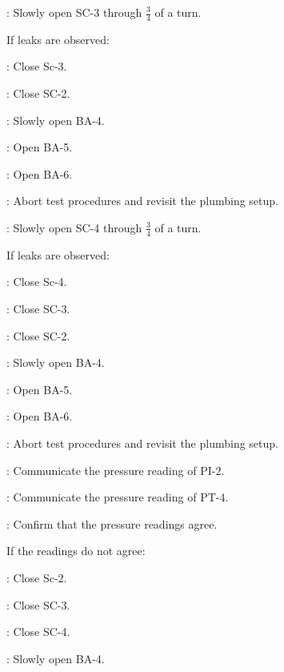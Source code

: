\begin{checklist}
\begin{checklist}
    \end{checklist}
    \item \primary{}: Slowly open SC-3 through $\frac{3}{4}$ of a turn.
    \item If leaks are observed:
    \begin{checklist}
            \item \primary{}: Close Sc-3.
            \item \primary{}: Close SC-2.
            \item \primary{}: Slowly open BA-4.
            \item \primary{}: Open BA-5. 
            \item \primary{}: Open BA-6. 
            \item \ops{}: Abort test procedures and revisit the plumbing setup. 
    \end{checklist}
    \item \primary{}: Slowly open SC-4 through $\frac{3}{4}$ of a turn.
    \item If leaks are observed:
    \begin{checklist}
            \item \primary{}: Close Sc-4.
            \item \primary{}: Close SC-3.
            \item \primary{}: Close SC-2. 
            \item \primary{}: Slowly open BA-4.
            \item \primary{}: Open BA-5. 
            \item \primary{}: Open BA-6. 
            \item \ops{}: Abort test procedures and revisit the plumbing setup. 
    \end{checklist}
    \item \primary{}: Communicate the pressure reading of PI-2. 
    \item \daq{}: Communicate the pressure reading of PT-4.
    \item \ops{}: Confirm that the pressure readings agree. 
    \item If the readings do not agree:
    \begin{checklist}
            \item \primary{}: Close Sc-2.
            \item \primary{}: Close SC-3.
            \item \primary{}: Close SC-4. 
            \item \primary{}: Slowly open BA-4.

\end{checklist}
\end{checklist}
